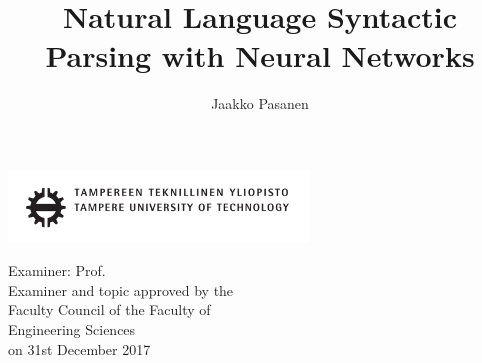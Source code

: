 \documentclass[12pt,a4paper,english
]{tutthesis}
\author{Jaakko Pasanen}
\title{Natural Language Syntactic Parsing with Neural Networks} %
\begin{document}
\makeatletter

%
\thispagestyle{empty}
\vspace*{-.5cm}\noindent
\includegraphics[width=8cm]{tty_tut_logo}   %

\vspace{6.8cm}
\maketitle
\vspace{6.7cm} %

\begin{flushright}  
  \begin{minipage}[c]{6.8cm}
    \begin{spacing}{1.0}
      \textsf{Examiner: Prof. \@examiner}\\
      \textsf{Examiner and topic approved by the}\\ 
      \textsf{Faculty Council of the Faculty of}\\
      \textsf{Engineering Sciences}\\
      \textsf{on 31st December 2017}\\
    \end{spacing}
  \end{minipage}
\end{flushright}

\if@twoside
\clearpage
\fi

%
\setcounter{page}{0} %
\end{document}
